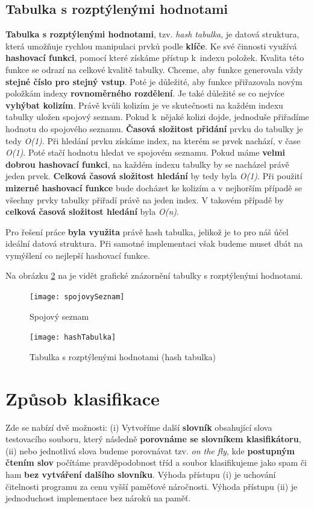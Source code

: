 \documentclass[12pt]{report}
\begin{document}
		\subsection{Tabulka s rozptýlenými hodnotami}
		\textbf{Tabulka s rozptýlenými hodnotami}, tzv. \textit{hash tabulka}, je datová struktura, která umožňuje rychlou manipulaci prvků podle \textbf{klíče}. Ke své činnosti využívá \textbf{hashovací funkci}, pomocí které získáme přístup k~indexu položek. Kvalita této funkce se odrazí na celkové kvalitě tabulky. Chceme, aby funkce generovala vždy \textbf{stejné číslo pro stejný vstup}. Poté je důležité, aby funkce přiřazovala novým položkám indexy \textbf{rovnoměrného rozdělení}. Je také důležité se co nejvíce \textbf{vyhýbat kolizím}. Právě kvůli kolizím je ve skutečnosti na každém indexu tabulky uložen spojový seznam. Pokud k~nějaké kolizi dojde, jednoduše přiřadíme hodnotu do spojového seznamu. \textbf{Časová složitost přidání} prvku do tabulky je tedy \textit{O(1)}. Při hledání prvku získáme index, na kterém se prvek nachází, v čase \textit{O(1)}. Poté stačí hodnotu hledat ve spojovém seznamu. Pokud máme \textbf{velmi dobrou hashovací funkci}, na každém indexu tabulky by se nacházel právě jeden prvek. \textbf{Celková časová složitost hledání} by tedy byla \textit{O(1)}. Při použití \textbf{mizerné hashovací funkce} bude docházet ke kolizím a v nejhorším případě se všechny prvky tabulky přiřadí právě na jeden index. V takovém případě by \textbf{celková časová složitost hledání} byla \textit{O(n)}.
		
		Pro řešení práce \textbf{byla využita} právě hash tabulka, jelikož je to pro náš účel ideální datová struktura. Při samotné implementaci však budeme muset dbát na vymýšlení co nejlepší hashovací funkce.
		
		Na obrázku \ref{fig:hashTabulka} na je vidět grafické znázornění tabulky s rozptýlenými hodnotami.

		\begin{figure}
			\centering
			\texttt{[image: spojovySeznam]}
			\caption{Spojový seznam}
			\label{fig:spojovySeznam}
		\end{figure}

		\begin{figure}
			\centering
			\texttt{[image: hashTabulka]}
			\caption{Tabulka s rozptýlenými hodnotami (hash tabulka)}
			\label{fig:hashTabulka}
		\end{figure}
	
	\section{Způsob klasifikace}
	\label{klasifikace}
	Zde se nabízí dvě možnosti: (i) Vytvoříme další \textbf{slovník} obsahující slova testovacího souboru, který následně \textbf{porovnáme se slovníkem klasifikátoru}, (ii) nebo jednotlivá slova budeme porovnávat tzv. \textit{on the fly}, kde \textbf{postupným čtením slov} počítáme pravděpodobnost tříd a soubor klasifikujeme jako spam či ham \textbf{bez vytváření dalšího slovníku}. Výhoda přístupu (i) je uchování čitelnosti programu za cenu vyšší paměťové náročnosti. Výhoda přístupu (ii) je jednoduchost implementace bez nároků na paměť.
	
\end{document}
